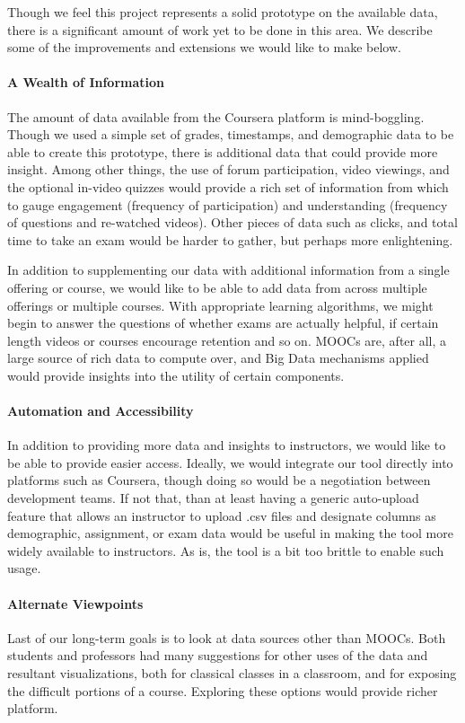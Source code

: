 Though we feel this project represents a solid prototype on the available data, there is a significant amount of work yet to be done in this area. We describe some of the improvements and extensions we would like to make below.

\paragraph{A Wealth of Information}
The amount of data available from the Coursera platform is mind-boggling. Though we used a simple set of grades, timestamps, and demographic data to be able to create this prototype, there is additional data that could provide more insight. Among other things, the use of forum participation, video viewings, and the optional in-video quizzes would provide a rich set of information from which to gauge engagement (frequency of participation) and understanding (frequency of questions and re-watched videos). Other pieces of data such as clicks, and total time to take an exam would be harder to gather, but perhaps more enlightening. 

In addition to supplementing our data with additional information from a single offering or course, we would like to be able to add data from across multiple offerings or multiple courses. With appropriate learning algorithms, we might begin to answer the questions of whether exams are actually helpful, if certain length videos or courses encourage retention and so on. MOOCs are, after all, a large source of rich data to compute over, and Big Data mechanisms applied would provide insights into the utility of certain components. 

\paragraph{Automation and Accessibility}
In addition to providing more data and insights to instructors, we would like to be able to provide easier access. Ideally, we would integrate our tool directly into platforms such as Coursera, though doing so would be a negotiation between development teams. If not that, than at least having a generic auto-upload feature that allows an instructor to upload .csv files and designate columns as demographic, assignment, or exam data would be useful in making the tool more widely available to instructors. As is, the tool is a bit too brittle to enable such usage. 
 
\paragraph{Alternate Viewpoints}
Last of our long-term goals is to look at data sources other than MOOCs. Both students and professors had many suggestions for other uses of the data and resultant visualizations, both for classical classes in a classroom, and for exposing the difficult portions of a course. Exploring these options would provide richer platform. 